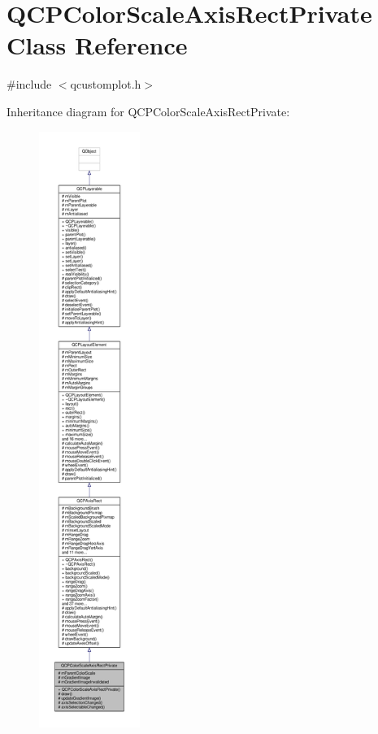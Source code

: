\hypertarget{class_q_c_p_color_scale_axis_rect_private}{}\section{Q\+C\+P\+Color\+Scale\+Axis\+Rect\+Private Class Reference}
\label{class_q_c_p_color_scale_axis_rect_private}


{\ttfamily \#include $<$qcustomplot.\+h$>$}



Inheritance diagram for Q\+C\+P\+Color\+Scale\+Axis\+Rect\+Private\+:\nopagebreak
\begin{figure}[H]
\begin{center}
\leavevmode
\includegraphics[height=550pt]{class_q_c_p_color_scale_axis_rect_private__inherit__graph}
\end{center}
\end{figure}


